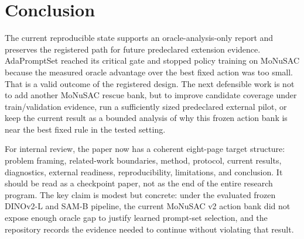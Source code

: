 \section{Conclusion}
The current reproducible state supports an oracle-analysis-only report and preserves the registered path for future predeclared extension evidence. AdaPromptSet reached its critical gate and stopped policy training on MoNuSAC because the measured oracle advantage over the best fixed action was too small. That is a valid outcome of the registered design. The next defensible work is not to add another MoNuSAC rescue bank, but to improve candidate coverage under train/validation evidence, run a sufficiently sized predeclared external pilot, or keep the current result as a bounded analysis of why this frozen action bank is near the best fixed rule in the tested setting.

For internal review, the paper now has a coherent eight-page target structure: problem framing, related-work boundaries, method, protocol, current results, diagnostics, external readiness, reproducibility, limitations, and conclusion. It should be read as a checkpoint paper, not as the end of the entire research program. The key claim is modest but concrete: under the evaluated frozen DINOv2-L and SAM-B pipeline, the current MoNuSAC v2 action bank did not expose enough oracle gap to justify learned prompt-set selection, and the repository records the evidence needed to continue without violating that result.
